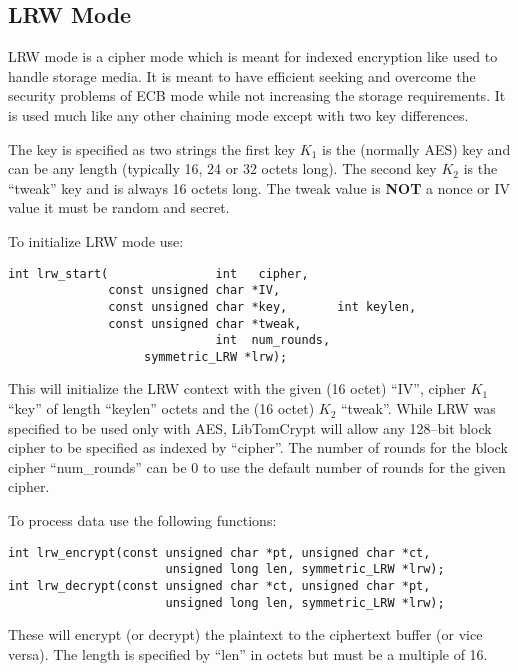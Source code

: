 \documentclass[a4paper]{book}
\begin{document}
\subsection{LRW Mode}

LRW mode is a cipher mode which is meant for indexed encryption like used to handle storage media.  It is meant to have efficient seeking and overcome the 
security problems of ECB mode while not increasing the storage requirements.  It is used much like any other chaining mode except with two key differences.

The key is specified as two strings the first key $K_1$ is the (normally AES) key and can be any length (typically 16, 24 or 32 octets long).  The second key 
$K_2$ is the ``tweak'' key and is always 16 octets long.  The tweak value is \textbf{NOT} a nonce or IV value it must be random and secret.  

To initialize LRW mode use:

\begin{verbatim}
int lrw_start(               int   cipher,
              const unsigned char *IV,
              const unsigned char *key,       int keylen,
              const unsigned char *tweak,
                             int  num_rounds, 
                   symmetric_LRW *lrw);
\end{verbatim}

This will initialize the LRW context with the given (16 octet) ``IV'', cipher $K_1$ ``key'' of length ``keylen'' octets and the (16 octet) $K_2$ ``tweak''.  
While LRW was specified to be used only with AES, LibTomCrypt will allow any 128--bit block cipher to be specified as indexed by ``cipher''.  The
number of rounds for the block cipher ``num\_rounds'' can be 0 to use the default number of rounds for the given cipher.

To process data use the following functions:

 
\begin{verbatim}
int lrw_encrypt(const unsigned char *pt, unsigned char *ct, 
                      unsigned long len, symmetric_LRW *lrw);
int lrw_decrypt(const unsigned char *ct, unsigned char *pt, 
                      unsigned long len, symmetric_LRW *lrw);
\end{verbatim}

These will encrypt (or decrypt) the plaintext to the ciphertext buffer (or vice versa).  The length is specified by ``len'' in octets but must be a multiple
of 16.
\end{document}

